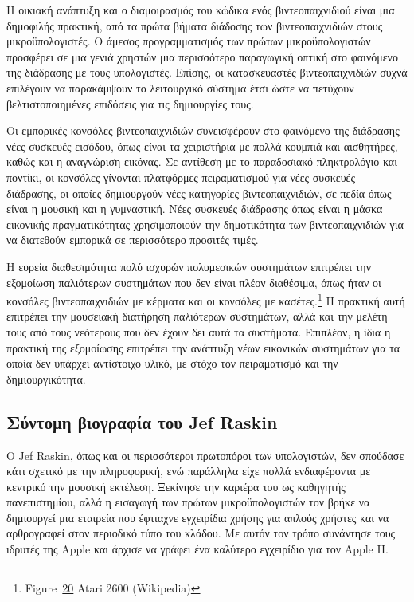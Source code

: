 \documentclass[
]{article}
\begin{document}
Η οικιακή ανάπτυξη και ο διαμοιρασμός του κώδικα ενός βιντεοπαιχνιδιού
είναι μια δημοφιλής πρακτική, από τα πρώτα βήματα διάδοσης των
βιντεοπαιχνιδιών στους μικροϋπολογιστές. Ο άμεσος προγραμματισμός των
πρώτων μικροϋπολογιστών προσφέρει σε μια γενιά χρηστών μια περισσότερο
παραγωγική οπτική στο φαινόμενο της διάδρασης με τους υπολογιστές.
Επίσης, οι κατασκευαστές βιντεοπαιχνιδιών συχνά επιλέγουν να παρακάμψουν
το λειτουργικό σύστημα έτσι ώστε να πετύχουν βελτιστοποιημένες επιδόσεις
για τις δημιουργίες τους.

Οι εμπορικές κονσόλες βιντεοπαιχνιδιών συνεισφέρουν στο φαινόμενο της
διάδρασης νέες συσκευές εισόδου, όπως είναι τα χειριστήρια με πολλά
κουμπιά και αισθητήρες, καθώς και η αναγνώριση εικόνας. Σε αντίθεση με
το παραδοσιακό πληκτρολόγιο και ποντίκι, οι κονσόλες γίνονται πλατφόρμες
πειραματισμού για νέες συσκευές διάδρασης, οι οποίες δημιουργούν νέες
κατηγορίες βιντεοπαιχνιδιών, σε πεδία όπως είναι η μουσική και η
γυμναστική. Νέες συσκευές διάδρασης όπως είναι η μάσκα εικονικής
πραγματικότητας χρησιμοποιούν την δημοτικότητα των βιντεοπαιχνιδιών για
να διατεθούν εμπορικά σε περισσότερο προσιτές τιμές.

Η ευρεία διαθεσιμότητα πολύ ισχυρών πολυμεσικών συστημάτων επιτρέπει την
εξομοίωση παλιότερων συστημάτων που δεν είναι πλέον διαθέσιμα, όπως ήταν
οι κονσόλες βιντεοπαιχνιδιών με κέρματα και οι κονσόλες με
κασέτες.\footnote{Figure~\protect\hyperlink{fig:atari-2600}{20} Atari
  2600 (Wikipedia)} Η πρακτική αυτή επιτρέπει την μουσειακή διατήρηση
παλιότερων συστημάτων, αλλά και την μελέτη τους από τους νεότερους που
δεν έχουν δει αυτά τα συστήματα. Επιπλέον, η ίδια η πρακτική της
εξομοίωσης επιτρέπει την ανάπτυξη νέων εικονικών συστημάτων για τα οποία
δεν υπάρχει αντίστοιχο υλικό, με στόχο τον πειραματισμό και την
δημιουργικότητα.

\hypertarget{ux3c3ux3cdux3bdux3c4ux3bfux3bcux3b7-ux3b2ux3b9ux3bfux3b3ux3c1ux3b1ux3c6ux3afux3b1-ux3c4ux3bfux3c5-jef-raskin}{%
\subsection{Σύντομη βιογραφία του Jef
Raskin}\label{ux3c3ux3cdux3bdux3c4ux3bfux3bcux3b7-ux3b2ux3b9ux3bfux3b3ux3c1ux3b1ux3c6ux3afux3b1-ux3c4ux3bfux3c5-jef-raskin}}

Ο Jef Raskin, όπως και οι περισσότεροι πρωτοπόροι των υπολογιστών, δεν
σπούδασε κάτι σχετικό με την πληροφορική, ενώ παράλληλα είχε πολλά
ενδιαφέροντα με κεντρικό την μουσική εκτέλεση. Ξεκίνησε την καριέρα του
ως καθηγητής πανεπιστημίου, αλλά η εισαγωγή των πρώτων μικροϋπολογιστών
τον βρήκε να δημιουργεί μια εταιρεία που έφτιαχνε εγχειρίδια χρήσης για
απλούς χρήστες και να αρθρογραφεί στον περιοδικό τύπο του κλάδου. Με
αυτόν τον τρόπο συνάντησε τους ιδρυτές της Apple και άρχισε να γράφει
ένα καλύτερο εγχειρίδιο για τον Apple II.
\end{document}
